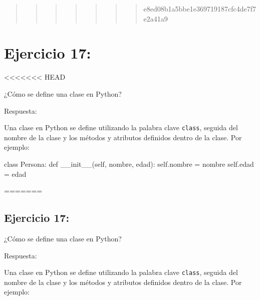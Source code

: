 \documentclass[
  a4paper,
  onepage,
  openany]{scrreprt}
\newenvironment{Shaded}{\begin{snugshade}}{\end{snugshade}}
\newcommand{\FunctionTok}[1]{\textcolor[rgb]{0.28,0.35,0.67}{#1}}
\newcommand{\KeywordTok}[1]{\textcolor[rgb]{0.00,0.23,0.31}{#1}}
\newcommand{\NormalTok}[1]{\textcolor[rgb]{0.00,0.23,0.31}{#1}}
\newcommand{\OperatorTok}[1]{\textcolor[rgb]{0.37,0.37,0.37}{#1}}
\newcommand{\VariableTok}[1]{\textcolor[rgb]{0.07,0.07,0.07}{#1}}
\begin{document}
\begin{quote}
\begin{quote}
\begin{quote}
\begin{quote}
\begin{quote}
\begin{quote}
\begin{quote}
e8ed08b1a5bbe1e369719187cfc4de7f7e2a41a9
\end{quote}
\end{quote}
\end{quote}
\end{quote}
\end{quote}
\end{quote}
\end{quote}

\hypertarget{ejercicio-17}{%
\chapter{Ejercicio 17:}\label{ejercicio-17}}

\textless\textless\textless\textless\textless\textless\textless{} HEAD

¿Cómo se define una clase en Python?

Respuesta:

Una clase en Python se define utilizando la palabra clave
\texttt{class}, seguida del nombre de la clase y los métodos y atributos
definidos dentro de la clase. Por ejemplo:

\begin{Shaded}
\begin{Highlighting}[]
\KeywordTok{class}\NormalTok{ Persona:}
    \KeywordTok{def} \FunctionTok{\_\_init\_\_}\NormalTok{(}\VariableTok{self}\NormalTok{, nombre, edad):}
        \VariableTok{self}\NormalTok{.nombre }\OperatorTok{=}\NormalTok{ nombre}
        \VariableTok{self}\NormalTok{.edad }\OperatorTok{=}\NormalTok{ edad}
\end{Highlighting}
\end{Shaded}

=======

\hypertarget{ejercicio-17-1}{%
\section{Ejercicio 17:}\label{ejercicio-17-1}}

¿Cómo se define una clase en Python?

Respuesta:

Una clase en Python se define utilizando la palabra clave
\texttt{class}, seguida del nombre de la clase y los métodos y atributos
definidos dentro de la clase. Por ejemplo:
\end{document}

